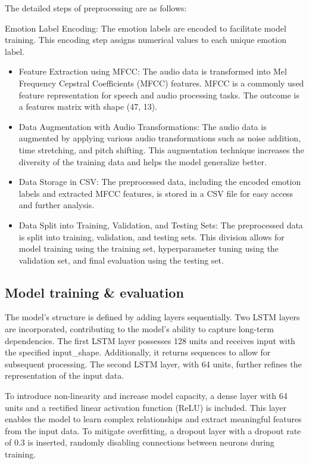The detailed steps of preprocessing are as follows:

Emotion Label Encoding: The emotion labels are encoded to facilitate model training. This encoding step assigns numerical values to each unique emotion label.

\begin{itemize}
    \item Feature Extraction using MFCC: The audio data is transformed into Mel Frequency Cepstral Coefficients (MFCC) features. MFCC is a commonly used feature representation for speech and audio processing tasks. The outcome is a features matrix with shape (47, 13).
    \item Data Augmentation with Audio Transformations: The audio data is augmented by applying various audio transformations such as noise addition, time stretching, and pitch shifting. This augmentation technique increases the diversity of the training data and helps the model generalize better.
    \item Data Storage in CSV: The preprocessed data, including the encoded emotion labels and extracted MFCC features, is stored in a CSV file for easy access and further analysis.
    \item Data Split into Training, Validation, and Testing Sets: The preprocessed data is split into training, validation, and testing sets. This division allows for model training using the training set, hyperparameter tuning using the validation set, and final evaluation using the testing set.
\end{itemize}
    
\subsection{Model training & evaluation}

The model's structure is defined by adding layers sequentially. Two LSTM layers are incorporated, contributing to the model's ability to capture long-term dependencies. The first LSTM layer possesses 128 units and receives input with the specified input_shape. Additionally, it returns sequences to allow for subsequent processing. The second LSTM layer, with 64 units, further refines the representation of the input data.

To introduce non-linearity and increase model capacity, a dense layer with 64 units and a rectified linear activation function (ReLU) is included. This layer enables the model to learn complex relationships and extract meaningful features from the input data. To mitigate overfitting, a dropout layer with a dropout rate of 0.3 is inserted, randomly disabling connections between neurons during training.

